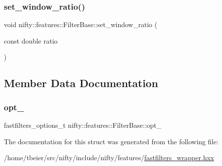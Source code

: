 \subsubsection{\texorpdfstring{set\+\_\+window\+\_\+ratio()}{set\_window\_ratio()}}
{\footnotesize\ttfamily void nifty\+::features\+::\+Filter\+Base\+::set\+\_\+window\+\_\+ratio (\begin{DoxyParamCaption}\item[{const double}]{ratio }\end{DoxyParamCaption})\hspace{0.3cm}{\ttfamily [inline]}}



\subsection{Member Data Documentation}
\mbox{\label{structnifty_1_1features_1_1FilterBase_a4bd3a5f88a4c061e80f0b0c4a1074c8c}} 
\subsubsection{\texorpdfstring{opt\+\_\+}{opt\_}}
{\footnotesize\ttfamily fastfilters\+\_\+options\+\_\+t nifty\+::features\+::\+Filter\+Base\+::opt\+\_\+\hspace{0.3cm}{\ttfamily [protected]}}



The documentation for this struct was generated from the following file\+:\begin{DoxyCompactItemize}
\item 
/home/tbeier/src/nifty/include/nifty/features/\hyperlink{fastfilters__wrapper_8hxx}{fastfilters\+\_\+wrapper.\+hxx}\end{DoxyCompactItemize}
